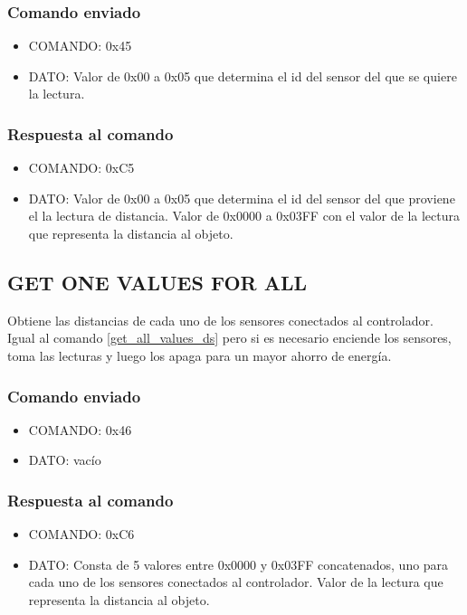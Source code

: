 \documentclass[a4paper,10pt]{article}
\begin{document}
\subsubsection*{Comando enviado}

\begin{itemize}
	\item{COMANDO:} 0x45
	\item{DATO:} Valor de 0x00 a 0x05 que determina el id del sensor del que se quiere la lectura.
\end{itemize}

\subsubsection*{Respuesta al comando}

\begin{itemize}
	\item{COMANDO:} 0xC5
	\item{DATO:} Valor de 0x00 a 0x05 que determina el id del sensor del que proviene el la lectura de distancia.
	Valor de 0x0000 a 0x03FF con el valor de la lectura que representa la distancia al objeto.
\end{itemize}

\subsection{GET ONE VALUES FOR ALL}
\label{get_one_values_for_all_ds}

Obtiene las distancias de cada uno de los sensores conectados al controlador.
Igual al comando \ref{get_all_values_ds} pero si es necesario enciende los sensores, toma las lecturas y luego los apaga para un mayor ahorro de energ\'ia.

\subsubsection*{Comando enviado}

\begin{itemize}
	\item{COMANDO:} 0x46
	\item{DATO:} vac\'io
\end{itemize}

\subsubsection*{Respuesta al comando}

\begin{itemize}
	\item{COMANDO:} 0xC6
	\item{DATO:} Consta de 5 valores entre 0x0000 y 0x03FF concatenados, uno para cada uno de los sensores conectados al controlador.
	Valor de la lectura que representa la distancia al objeto.
\end{itemize}
\end{document}
